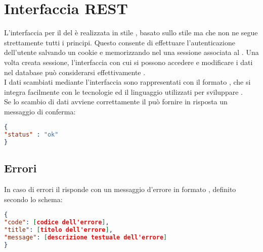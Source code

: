 \section{Interfaccia REST}\label{rest}
L'interfaccia per il  del  \progetto è realizzata in stile , basato sullo stile  ma che non ne segue strettamente tutti i principi.
Questo consente di effettuare l'autenticazione dell'utente salvando un cookie e memorizzando nel  una sessione associata al .
Una volta creata sessione, l'interfaccia con cui si possono accedere e modificare i dati nel database può considerarsi effettivamente .\\
I dati scambiati mediante l'interfaccia sono rappresentati con il formato , che si integra facilmente con le tecnologie ed il linguaggio utilizzati per sviluppare \progetto.\\
Se lo scambio di dati avviene correttamente il  può fornire in risposta un messaggio di conferma:
\begin{lstlisting}[language=json,firstnumber=1]
{
"status" : "ok"
}
\end{lstlisting}
\subsection{Errori}
In caso di errori il  risponde con un messaggio d'errore in formato , definito secondo lo schema:
\begin{lstlisting}[language=json,firstnumber=1]
{
"code": [codice dell'errore],
"title": [titolo dell'errore],
"message": [descrizione testuale dell'errore]
}
\end{lstlisting}
